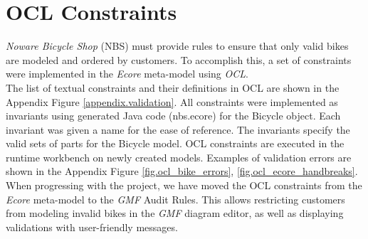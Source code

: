 \section{OCL Constraints}
\label{sec.ocl_constraints}

\noindent 
\emph{Noware Bicycle Shop} (NBS) must provide rules to ensure that
only valid bikes are modeled and ordered by customers. To accomplish this, a 
set of constraints were implemented in the \emph{Ecore} meta-model using \emph{OCL}.\\

\noindent
The list of textual constraints and their definitions in OCL are
shown in the Appendix Figure \ref{appendix.validation}. All constraints were implemented as invariants using
generated Java code (nbs.ecore) for the Bicycle object. Each invariant was given
a name for the ease of reference. The invariants specify the valid sets
of parts for the Bicycle model. OCL constraints are executed in the runtime
workbench on newly created models. Examples of validation errors are shown in the Appendix Figure
\ref{fig.ocl_bike_errors}, \ref{fig.ocl_ecore_handbreaks}.\\

\noindent 
When progressing with the project, we have moved the OCL constraints from the
\emph{Ecore} meta-model to the \emph{GMF} Audit Rules. This allows
restricting customers from modeling invalid bikes in the \emph{GMF} diagram
editor, as well as displaying validations with user-friendly
messages.\\


